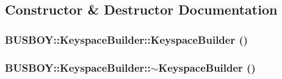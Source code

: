 \subsection{Constructor \& Destructor Documentation}
\hypertarget{classBUSBOY_1_1KeyspaceBuilder_a4e7ff3c10ed5a2f124c11585ef289557}{
\subsubsection[{KeyspaceBuilder}]{\setlength{\rightskip}{0pt plus 5cm}BUSBOY::KeyspaceBuilder::KeyspaceBuilder ()}}
\label{classBUSBOY_1_1KeyspaceBuilder_a4e7ff3c10ed5a2f124c11585ef289557}
\hypertarget{classBUSBOY_1_1KeyspaceBuilder_a23ea85cfd091c99af2cb1b3a7f076472}{
\subsubsection[{$\sim$KeyspaceBuilder}]{\setlength{\rightskip}{0pt plus 5cm}BUSBOY::KeyspaceBuilder::$\sim$KeyspaceBuilder ()}}
\label{classBUSBOY_1_1KeyspaceBuilder_a23ea85cfd091c99af2cb1b3a7f076472}


